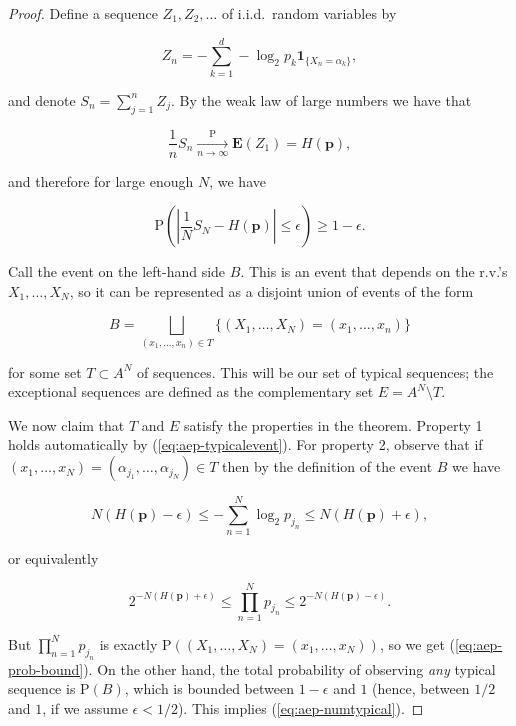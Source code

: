 \documentclass[11pt]{report}
\theoremstyle{plain}
\theoremstyle{definition}
\begin{document}
\begin{proof}
Define a sequence $Z_1, Z_2, \ldots$ of i.i.d.\ random variables by

\[
Z_n = -\sum_{k=1}^d -\log_2 p_k \mathbf{1}_{\{X_n = \alpha_k\}},
\]

and denote $S_n = \sum_{j=1}^n Z_j$. By the weak law of large numbers we have that

\[
\frac{1}{n} S_n \xrightarrow[n\to\infty]{\textrm{P}} \mathbf{E}(Z_1) = H(\mathbf{p}),
\]

and therefore for large enough $N$, we have

\begin{equation*} \tag{28}\label{eq:aep-typicalevent}
\mathrm{P}\left(\left|\frac{1}{N}S_N- H(\mathbf{p})\right|\le \epsilon \right)\ge 1-\epsilon.
\end{equation*}

Call the event on the left-hand side $B$. This is an event that depends on the r.v.'s $X_1,\ldots,X_N$, so it can be represented as a disjoint union of events of the form

\[
B = \bigsqcup_{(x_1,\ldots,x_n)\in T} \{ (X_1,\ldots,X_N) = (x_1,\ldots,x_n) \}
\]

for some set $T\subset A^N$ of sequences. This will be our set of typical sequences; the exceptional sequences are defined as the complementary set $E = A^N\setminus T$.

We now claim that $T$ and $E$ satisfy the properties in the theorem. Property 1 holds automatically by (\ref{eq:aep-typicalevent}). For property 2, observe that if $(x_1,\ldots,x_N)=(\alpha_{j_1},\ldots,\alpha_{j_N})\in T$ then by the definition of the event $B$ we have

\[
N\left(H(\mathbf{p}) - \epsilon\right) \le
-\sum_{n=1}^N \log_2 p_{j_n} \le N\left(H(\mathbf{p}) + \epsilon\right),
\]

or equivalently

\[
2^{-N\left(H(\mathbf{p}) + \epsilon\right)} \le
\prod_{n=1}^N p_{j_n} \le
2^{-N\left(H(\mathbf{p}) - \epsilon\right)}.
\]

But $\prod_{n=1}^N p_{j_n}$ is exactly $\mathrm{P}((X_1,\ldots,X_N)=(x_1,\ldots,x_N))$, so we get (\ref{eq:aep-prob-bound}). On the other hand, the total probability of observing \emph{any} typical sequence is $\mathrm{P}(B)$, which is bounded between $1-\epsilon$ and $1$ (hence, between $1/2$ and $1$, if we assume $\epsilon<1/2$). This implies (\ref{eq:aep-numtypical}).
\end{proof}
\end{document}
